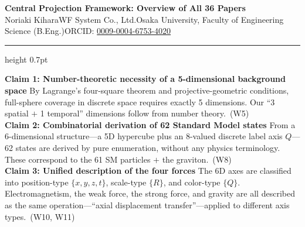 \documentclass[9pt,a4paper]{article}
\begin{document}
\begin{center}
{\Large\bfseries Central Projection Framework: Overview of All 36 Papers}\\[2pt]
{\small Noriaki Kihara\enspace WF System Co., Ltd.\enspace Osaka University, Faculty of Engineering Science (B.Eng.)\enspace ORCID: \href{https://orcid.org/0009-0004-6753-4020}{0009-0004-6753-4020}}
\end{center}

\vspace{-1pt}
\hrule height 0.7pt
\vspace{4pt}

\begin{tcolorbox}[colback=gray!7,colframe=gray!55,boxrule=0.4pt,arc=2pt,left=4pt,right=4pt,top=2pt,bottom=2pt]
{\small
\textbf{Claim 1: Number-theoretic necessity of a 5-dimensional background space}\enspace
By Lagrange's four-square theorem and projective-geometric conditions, full-sphere coverage in discrete space requires exactly 5 dimensions. Our ``3 spatial $+$ 1 temporal'' dimensions follow from number theory.{\scriptsize\ (W5)}\\[2pt]
\textbf{Claim 2: Combinatorial derivation of 62 Standard Model states}\enspace
From a 6-dimensional structure---a 5D hypercube plus an 8-valued discrete label axis $Q$---62 states are derived by pure enumeration, without any physics terminology. These correspond to the 61 SM particles $+$ the graviton.{\scriptsize\ (W8)}\\[2pt]
\textbf{Claim 3: Unified description of the four forces}\enspace
The 6D axes are classified into position-type $\{x,y,z,t\}$, scale-type $\{R\}$, and color-type $\{Q\}$. Electromagnetism, the weak force, the strong force, and gravity are all described as the same operation---``axial displacement transfer''---applied to different axis types.{\scriptsize\ (W10, W11)}}
\end{tcolorbox}

\vspace{2pt}
\end{document}

